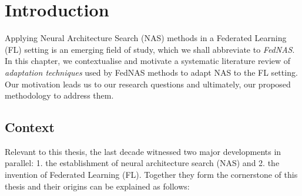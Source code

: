 \chapter{Introduction}\label{chapter:introduction}

Applying Neural Architecture Search (NAS) methods in a Federated Learning (FL) setting is an emerging field of study, which we shall abbreviate to \textit{FedNAS}. In this chapter, we contextualise and motivate a systematic literature review of \textit{adaptation techniques} used by FedNAS methods to adapt NAS to the FL setting. Our motivation leads us to our research questions and ultimately, our proposed methodology to address them.

\section{Context}

Relevant to this thesis, the last decade witnessed two major developments in parallel: 1. the establishment of neural architecture search (NAS) and 2. the invention of Federated Learning (FL). Together they form the cornerstone of this thesis and their origins can be explained as follows:

